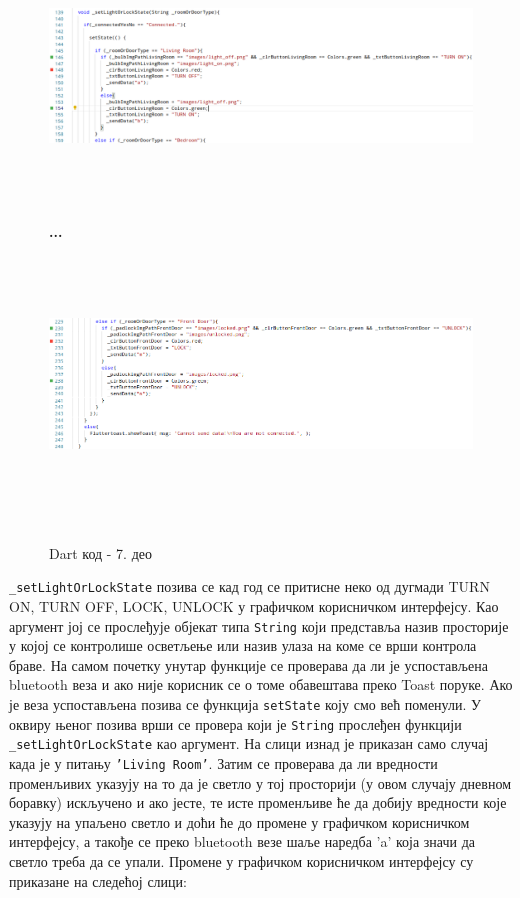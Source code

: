 \documentclass[12pt]{article}
\begin{document}
\begin{figure}[H]
\centering
\includegraphics[height=7.5cm, width=17cm]{images/dart7}
\vspace{0.2cm}
\textbf{...}
\vspace{0.2cm}
\includegraphics[height=7.5cm, width=17cm]{images/dart8}
\caption{Dart код - 7. део}
\end{figure}
\indent{} \texttt{\_setLightOrLockState} позива се кад год се притисне неко од дугмади TURN ON, TURN OFF, LOCK, UNLOCK у графичком корисничком интерфејсу. Као аргумент јој се прослеђује објекат типа \texttt{String} који представља назив просторије у којој се контролише осветљење или назив улаза на коме се врши контрола браве. На самом почетку унутар функције се проверава да ли је успостављена bluetooth веза и ако није корисник се о томе обавештава преко Toast поруке. Ако је веза успостављена позива се функција \texttt{setState} коју смо већ поменули. У оквиру њеног позива врши се провера који је \texttt{String} прослеђен функцији \texttt{\_setLightOrLockState} као аргумент. На слици изнад је приказан само случај када је у питању \texttt{'Living Room'}. Затим се проверава да ли вредности променљивих указују на то да је светло у тој просторији (у овом случају дневном боравку) искључено и ако јесте, те исте променљиве ће да добију вредности које указују на упаљено светло и доћи ће до промене у графичком корисничком интерфејсу, а такође се преко bluetooth везе шаље наредба 'a' која значи да светло треба да се упали. Промене у графичком корисничком интерфејсу су приказане на следећој слици:
\end{document}
